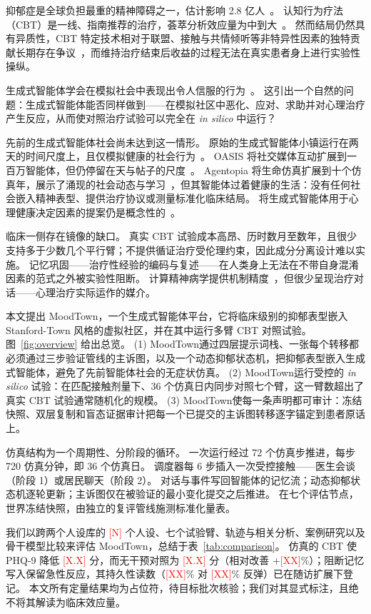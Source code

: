 \documentclass[11pt,a4paper]{article}
\newcommand{\ph}[1]{\textcolor{red}{[#1]}}
\newcommand{\sys}{MoodTown}
\begin{document}
抑郁症是全球负担最重的精神障碍之一，估计影响 2.8 亿人~\citep{who2022}。
认知行为疗法（CBT）是一线、指南推荐的治疗，荟萃分析效应量为中到大~\citep{cuijpers2013,hofmann2012,cuijpers2023}。
然而结局仍然具有异质性，CBT 特定技术相对于联盟、接触与共情倾听等非特异性因素的独特贡献长期存在争议~\citep{lambert1992}，而维持治疗结束后收益的过程无法在真实患者身上进行实验性操纵。

生成式智能体学会在模拟社会中表现出令人信服的行为~\citep{park2023}。
这引出一个自然的问题：生成式智能体能否同样做到——在模拟社区中恶化、应对、求助并对心理治疗产生反应，从而使对照治疗试验可以完全在 \emph{in silico} 中运行？

先前的生成式智能体社会尚未达到这一情形。
原始的生成式智能体小镇运行在两天的时间尺度上，且仅模拟健康的社会行为~\citep{park2023}。
OASIS 将社交媒体互动扩展到一百万智能体，但仍停留在天与帖子的尺度~\citep{oasis2024}。
Agentopia 将生命仿真扩展到十个仿真年，展示了涌现的社会动态与学习~\citep{agentopia2026}，但其智能体过着健康的生活：没有任何社会嵌入精神表型、提供治疗协议或测量标准化临床结局。
将生成式智能体用于心理健康决定因素的提案仍是概念性的~\citep{kambeitz2025}。

临床一侧存在镜像的缺口。
真实 CBT 试验成本高昂、历时数月至数年，且很少支持多于少数几个平行臂；不提供循证治疗受伦理约束，因此成分分离设计难以实施。
记忆巩固——治疗性经验的编码与复述——在人类身上无法在不带自身混淆因素的范式之外被实验性阻断。
计算精神病学提供机制精度~\citep{montague2012,hauser2022,friston2023,zavlis2025}，但很少呈现治疗对话——心理治疗实际运作的媒介。

本文提出 \sys，一个生成式智能体平台，它将临床级别的抑郁表型嵌入 Stanford-Town 风格的虚拟社区，并在其中运行多臂 CBT 对照试验。
图~\ref{fig:overview} 给出总览。
(1) \sys 通过四层提示词栈、一张每个转移都必须通过三步验证管线的主诉图，以及一个动态抑郁状态机，把抑郁表型嵌入生成式智能体，避免了先前智能体社会的无症状仿真。
(2) \sys 运行受控的 \emph{in silico} 试验：在匹配接触剂量下、36 个仿真日内同步对照七个臂，这一臂数超出了真实 CBT 试验通常随机化的规模。
(3) \sys 使每一条声明都可审计：冻结快照、双层复制和盲态证据审计把每一个已提交的主诉图转移逐字锚定到患者原话上。

仿真结构为一个周期性、分阶段的循环。
一次运行经过 72 个仿真步推进，每步 720 仿真分钟，即 36 个仿真日。
调度器每 6 步插入一次受控接触——医生会谈（阶段 1）或居民聊天（阶段 2）。
对话与事件写回智能体的记忆流；动态抑郁状态机逐轮更新；主诉图仅在被验证的最小变化提交之后推进。
在七个评估节点，世界冻结快照，由独立的复评管线施测标准化量表。

我们以跨两个人设库的 \ph{N} 个人设、七个试验臂、轨迹与相关分析、案例研究以及骨干模型比较来评估 \sys，总结于表~\ref{tab:comparison}。
仿真的 CBT 使 PHQ-9 降低 \ph{X.X} 分，而无干预对照为 \ph{X.X} 分（相对改善 +\ph{XX}\%）；阻断记忆写入保留急性反应，其持久性读数（\ph{XX}\% 对 \ph{XX}\% 反弹）已在随访扩展下登记。
本文所有定量结果均为占位符，待目标批次核验；我们对其显式标注，且绝不将其解读为临床效应量。
\end{document}
